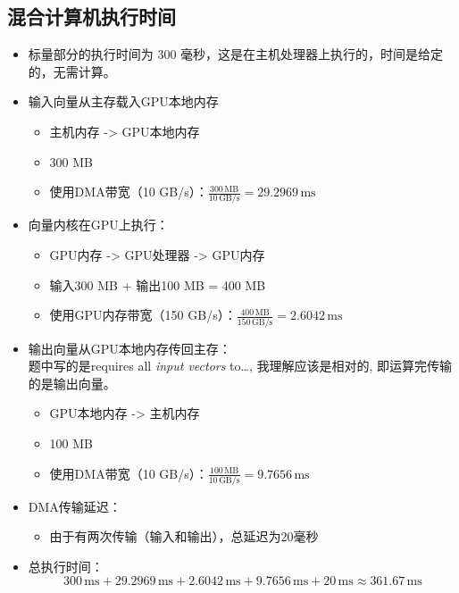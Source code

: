 \documentclass{article}
\begin{document}
\subsection*{混合计算机执行时间}
\begin{itemize}
    \item 标量部分的执行时间为 300 毫秒，这是在主机处理器上执行的，时间是给定的，无需计算。
    \item 输入向量从主存载入GPU本地内存
          \begin{itemize}
              \item 主机内存 -> GPU本地内存
              \item 300 MB
              \item 使用DMA带宽（10 GB/s）：\( \frac{300\,\text{MB}}{10\,\text{GB/s}} = 29.2969\,\text{ms}\)
          \end{itemize}
    \item 向量内核在GPU上执行：
          \begin{itemize}
              \item GPU内存 -> GPU处理器 -> GPU内存
              \item 输入300 MB + 输出100 MB = 400 MB
              \item 使用GPU内存带宽（150 GB/s）：\( \frac{400\,\text{MB}}{150\,\text{GB/s}} = 2.6042\,\text{ms}\)
          \end{itemize}
    \item 输出向量从GPU本地内存传回主存：\\
          题中写的是requires all \textit{input vectors} to\dots, 我理解应该是相对的, 即运算完传输的是输出向量。
          \begin{itemize}
              \item GPU本地内存 -> 主机内存
              \item 100 MB
              \item 使用DMA带宽（10 GB/s）：\( \frac{100\,\text{MB}}{10\,\text{GB/s}} = 9.7656\,\text{ms}\)
          \end{itemize}
    \item DMA传输延迟：
          \begin{itemize}
              \item 由于有两次传输（输入和输出），总延迟为20毫秒
          \end{itemize}
    \item 总执行时间：
          \[300\,\text{ms} + 29.2969\,\text{ms} +
              2.6042\,\text{ms} + 9.7656\,\text{ms} +
              20\,\text{ms}\approx361.67\,\text{ms}\]
\end{itemize}
\end{document}
